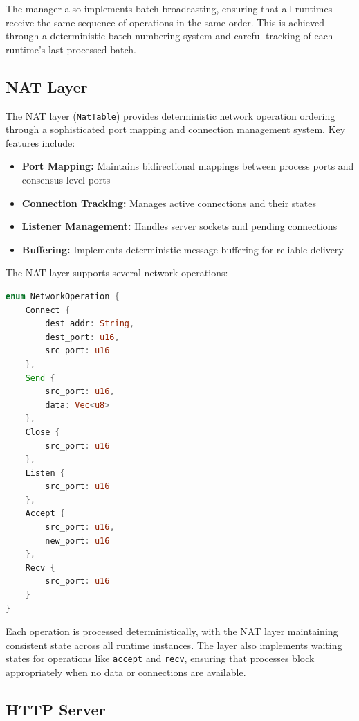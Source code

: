 \documentclass[10pt]{IEEEtran}
\begin{document}
The manager also implements batch broadcasting, ensuring that all runtimes receive the same sequence of operations in the same order. This is achieved through a deterministic batch numbering system and careful tracking of each runtime's last processed batch.

\subsection{NAT Layer}

The NAT layer (\texttt{NatTable}) provides deterministic network operation ordering through a sophisticated port mapping and connection management system. Key features include:

\begin{itemize}
    \item \textbf{Port Mapping:} Maintains bidirectional mappings between process ports and consensus-level ports
    \item \textbf{Connection Tracking:} Manages active connections and their states
    \item \textbf{Listener Management:} Handles server sockets and pending connections
    \item \textbf{Buffering:} Implements deterministic message buffering for reliable delivery
\end{itemize}

The NAT layer supports several network operations:
\begin{lstlisting}[language=Rust]
enum NetworkOperation {
    Connect { 
        dest_addr: String,
        dest_port: u16,
        src_port: u16
    },
    Send { 
        src_port: u16,
        data: Vec<u8>
    },
    Close { 
        src_port: u16
    },
    Listen { 
        src_port: u16
    },
    Accept { 
        src_port: u16,
        new_port: u16
    },
    Recv { 
        src_port: u16
    }
}
\end{lstlisting}

Each operation is processed deterministically, with the NAT layer maintaining consistent state across all runtime instances. The layer also implements waiting states for operations like \texttt{accept} and \texttt{recv}, ensuring that processes block appropriately when no data or connections are available.

\subsection{HTTP Server}
\end{document}
